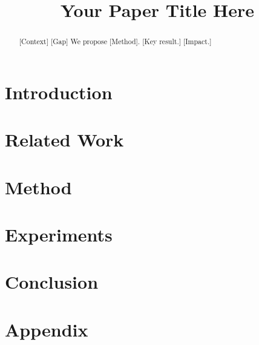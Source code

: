 \documentclass{article}
\title{Your Paper Title Here}
\begin{document}
\maketitle

\begin{abstract}
  [Context] [Gap] We propose [Method]. [Key result.] [Impact.]
\end{abstract}

\section{Introduction}
\section{Related Work}
\section{Method}
\section{Experiments}
\section{Conclusion}




\appendix
\section{Appendix}
\end{document}
